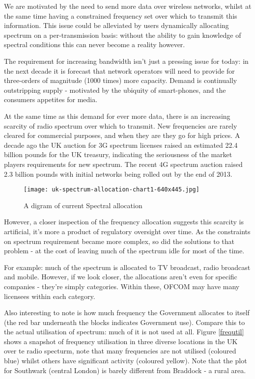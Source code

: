 We are motivated by the need to send more data over wireless networks, whilst at the same time having a constrained frequency set over which to transmit this information. This issue could be alleviated by users dynamically allocating spectrum on a per-transmission basis: without the ability to gain knowledge of spectral conditions this can never become a reality however. 

The requirement for increasing bandwidth isn't just a pressing issue for today: in the next decade it is forecast that network operators will need to provide for three-orders of magnitude (1000 times) more capacity. Demand is continually outstripping supply - motivated by the ubiquity of smart-phones, and the consumers appetites for media. 

At the same time as this demand for ever more data, there is an increasing scarcity of radio spectrum over which to transmit. New frequencies are rarely cleared for commercial purposes, and when they are they go for high prices.  A decade ago the UK auction for 3G spectrum licenses raised an estimated 22.4 billion pounds for the UK treasury, indicating the seriousness of the market players requirements for new spectrum. The recent 4G spectrum auction raised 2.3 billion pounds with initial networks being rolled out by the end of 2013.

\begin{figure*}[h]
\centering
\texttt{[image: uk-spectrum-allocation-chart1-640x445.jpg]}
\caption{A digram of current Spectral allocation \cite{Strategy2013}}
\label{spectrumalloc}
\end{figure*}

However, a closer inspection of the frequency allocation suggests this scarcity is artificial, it's more a product of regulatory oversight over time. As the constraints on spectrum requirement became more complex, so did the solutions to that problem - at the cost of leaving much of the spectrum idle for most of the time. 

For example: much of the spectrum is allocated to TV broadcast, radio broadcast and mobile. However, if we look closer, the allocations aren't even for specific companies - they're simply categories. Within these, OFCOM may have many licensees within each category.

Also interesting to note is how much frequency the Government allocates to itself (the red bar underneath the blocks indicates Government use). Compare this to the actual utilisation of spectrum: much of it is not used at all. Figure \ref{frequtil} shows a snapshot of frequency utilisation in three diverse locations in the UK over te radio specturm, note that many frequencies are not utilised (coloured blue) whilst others have significant activity (coloured yellow). Note that the plot for Southwark (central London) is barely different from Braddock - a rural area. 

